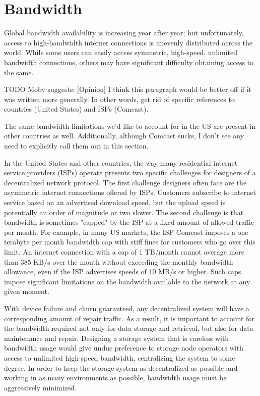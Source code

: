 \documentclass[11pt,fleqn,openany]{book}
\newcommand{\todo}[1]{{\color{red} TODO #1 }}
\begin{document}
\section{Bandwidth}

Global bandwidth availability is increasing year after year; but unfortunately,
access to
high-bandwidth internet connections is unevenly distributed across the world.
While some users can easily access symmetric, high-speed, unlimited bandwidth
connections, others may have significant difficulty obtaining access to the same.

\todo{Moby suggests:
[Opinion] I think this paragraph would be better off if it was written more generally. In other words, get rid of specific references to countries (United States) and ISPs (Comcast).

The same bandwidth limitations we'd like to account for in the US are present in other countries as well. Additionally, although Comcast sucks, I don't see any need to explicitly call them out in this section.
}

In the United States and other countries,
the way many residential internet service providers (ISPs)
operate presents two specific challenges for designers of a
decentralized network protocol. The first challenge designers often face are
the asymmetric internet connections offered by ISPs.
Customers subscribe to internet service
based on an advertised download speed, but the upload speed is potentially an
order of magnitude or two slower. The second challenge is that bandwidth is
sometimes "capped" by the ISP at a fixed amount of allowed traffic per month.
For example, in many
US markets, the ISP Comcast imposes a one terabyte per month bandwidth cap
with stiff fines for customers who go over this limit. \cite{comcast-cap}
An internet connection with a cap of 1 TB/month cannot average more than
385 KB/s over the month without exceeding the monthly bandwidth allowance,
even if the ISP advertises speeds of 10 MB/s or higher.
Such caps impose
significant limitations on the bandwidth available to the network
at any given moment.

With device failure and churn guaranteed, any decentralized system will have a
corresponding amount of repair traffic. As a result, it is important to account
for the bandwidth required not only for data storage and retrieval, but also
for data maintenance and repair. Designing a
storage system that is careless with bandwidth usage would give undue
preference to storage node operators with access to unlimited high-speed
bandwidth, centralizing the system to some degree. In order to keep the storage
system as decentralized as possible and working in as many environments
as possible, bandwidth usage must be aggressively minimized.
\end{document}
